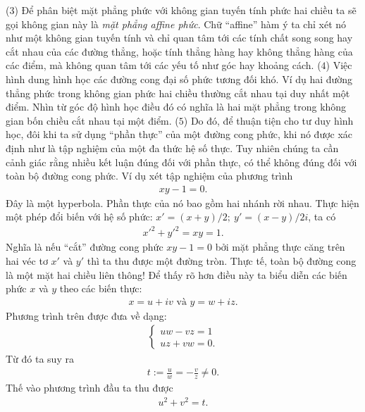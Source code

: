 \begin{multicols}{2}
	\vskip 0.1cm
	($3$) Để phân biệt mặt phẳng phức với không gian tuyến tính phức hai chiều ta sẽ gọi không gian này là {\em mặt phẳng affine phức}. Chữ ``affine'' hàm ý ta chỉ xét nó như một không gian tuyến tính và chỉ quan tâm tới các tính chất song song hay cắt nhau của các đường thẳng, hoặc tính thẳng hàng hay không thẳng hàng của các điểm, mà không quan tâm tới các yếu tố như góc hay khoảng cách. 
	\vskip 0.1cm
	($4$) Việc hình dung hình học các đường cong đại số phức tương đối khó. Ví dụ hai đường thẳng phức trong không gian phức hai chiều thường cắt nhau tại duy nhất một điểm. Nhìn từ góc độ hình học điều đó có nghĩa là hai mặt phẳng trong không gian bốn chiều cắt nhau tại một điểm. 
	\vskip 0.1cm
	($5$) Do đó, để thuận tiện cho tư duy hình học, đôi khi ta sử dụng ``phần thực'' của một đường cong phức, khi nó được xác định như là tập nghiệm của một đa thức hệ số thực. Tuy nhiên chúng ta cần cảnh giác rằng nhiều kết luận đúng đối với phần thực, có thể không đúng đối với toàn bộ đường cong phức. 
	\vskip 0.1cm
	Ví dụ xét tập nghiệm của phương trình
	\begin{align*}
		xy-1=0.
	\end{align*}
	Đây là một hyperbola. Phần thực của nó bao gồm hai nhánh rời nhau. 
	Thực hiện một phép đổi biến với hệ số phức:
	$x'=(x+y)/2;\ y'=(x-y)/2i$, ta có
	\begin{align*}
		{x'}^2+{y'}^2=xy=1.
	\end{align*}
	Nghĩa là nếu ``cắt'' đường cong phức $xy-1=0$ bởi mặt phẳng thực căng trên hai véc tơ $x'$ và $y'$ thì ta thu được một đường tròn. 
	\vskip 0.1cm
	Thực tế, toàn bộ đường cong là một mặt hai chiều liên thông! 
	Để thấy rõ hơn điều này ta biểu diễn các biến phức $x$ và $y$ theo các biến thực:
	\begin{align*}
		x=u+iv\text{ và } y=w+iz.
	\end{align*}
	Phương trình trên được đưa về dạng:
	\begin{align*}
		\begin{cases}
			 uw-vz=1\\
			 uz+vw=0.
		\end{cases}
	\end{align*}
	Từ đó ta suy ra
	\begin{align*}
		t:=\frac uw=-\frac vz\neq 0.
	\end{align*}
	Thế vào phương trình đầu ta thu được
	\begin{align*}
		u^2+v^2=t.
	\end{align*}
	\begin{figure}[H]

\end{figure}
\end{multicols}
